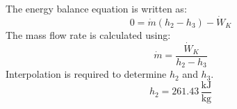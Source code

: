 The energy balance equation is written as:  
\[
0 = \dot{m} (h_2 - h_3) - \dot{W}_K
\]  
The mass flow rate is calculated using:  
\[
\dot{m} = \frac{\dot{W}_K}{h_2 - h_3}
\]  
Interpolation is required to determine \(h_2\) and \(h_3\).  
\[
h_2 = 261.43 \, \frac{\text{kJ}}{\text{kg}}
\]